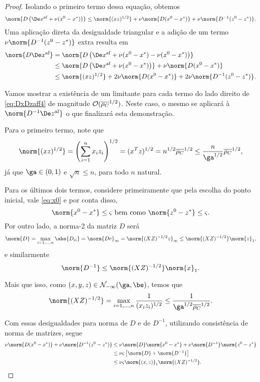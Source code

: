 \begin{proof}
Isolando o primeiro termo dessa equação, obtemos
\[
\norm{D\left(\dex +  \nu(\xzero - \xstar)\right)} \leq  
	  \norm{(xz)^{1/2}} + \nu \norm{D(\xzero - \xstar)} + \nu \norm{D^{-1}(\zzero - \zstar)}.
\]
Uma aplicação direta da desigualdade triangular e a adição de um termo  $\nu \norm{D^{-1}(\zzero - \zstar)}$ extra resulta em
\begin{align}
	\norm{D\dex} & =  \norm{D\left(\dex +  \nu(\xzero - \xstar)  -  \nu(\xzero - \xstar)\right)} \notag \\ 
				 & \leq	 \norm{D\left(\dex +  \nu(\xzero - \xstar)\right)} +  \nu\norm{D(\xzero - \xstar)} \notag \\
				 & \leq \norm{(xz)^{1/2}} + 2 \nu \norm{D(\xzero - \xstar)} + 2\nu \norm{D^{-1}(\zzero - \zstar)}.\label{eq:DxDzaff4}
\end{align}

Vamos mostrar a existência de um limitante para cada termo do lado direito de \eqref{eq:DxDzaff4} de magnitude $\mathcal{O}(\overline{\rho_C}^{1/2})$. Neste caso, o mesmo se aplicará à $\norm{D^{-1}\dez}$ o que finalizará esta demonstração.

Para o primeiro termo, note que 
\begin{equation}
	\label{eq:DxDzaff5}
	\norm{(xz)^{1/2}} = \left(\sum_{i=1}^{n}x_iz_i\right)^{1/2} = (x^{T}z)^{1/2} = n^{1/2}\dbvec{\rho_C}^{1/2} \leq \frac{n}{\ga^{1/2}}\dbvec{\rho_C}^{1/2},
\end{equation}
já que $\ga\in(0,1)$ e $\sqrt{n}\leq n$, para todo $n$ natural.

Para os últimos dois termos, considere primeiramente que pela escolha do ponto inicial, vale \eqref{eq:x0} e por conta disso, 
\[
\norm{\xzero - \xstar} \leq \bdxzstar \text{ bem como } \norm{\zzero - \zstar} \leq \bdxzstar.
\]
Por outro lado, a norma-2 da matriz  $D$ será
\[
 \norm{D} = \max_{i=1,\ldots,n} \abs{D_{ii}} = \norm{De}_{\infty} = \norm{(XZ)^{-1/2}z}_{\infty} \leq \norm{(XZ)^{-1/2}}\norm{z}_{1},
\]
e similarmente
\[
\norm{D^{-1}} \leq  \norm{(XZ)^{-1/2}} \norm{x}_{1}.
\]

Mais que isso, como $(x,y,z)\in\Nset_{-\infty}(\ga,\be)$, temos que 
\begin{equation}
\label{eq:DxDzaff6}
	\norm{(XZ)^{-1/2}} = \max_{i=1,\ldots,n}\frac{1}{(x_iz_i)^{1/2}} \leq \frac{1}{\ga^{1/2}\dbvec{\rho_{C}}^{1/2}}.
\end{equation}

Com essas desigualdades para norma de $D$ e de $D^{-1}$, utilizando consistência de norma de matrizes, segue 
\begin{align*}
 \nu \norm{D(\xzero - \xstar)} + \nu \norm{D^{-1}(\zzero - \zstar)}  & \leq \nu \norm{D}\norm{\xzero - \xstar} + \nu \norm{D^{-1}}\norm{\zzero - \zstar} \notag \\
 					& \leq \nu\bdxzstar\left[  \norm{D} + \norm{D^{-1}}   \right] \notag \\ 
 					& \leq \nu\bdxzstar\norm{(x,z)}_{1}\norm{(XZ)^{-1/2}} .\notag
\end{align*}


\end{proof}
